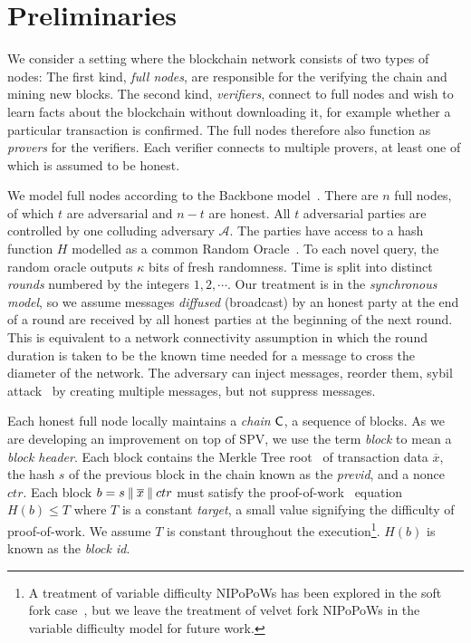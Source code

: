 \section{Preliminaries}\label{sec:preliminaries}

We consider a setting where the blockchain network consists of two
types of nodes: The first kind, \emph{full nodes}, are responsible for the
verifying the chain and mining new blocks. The
second kind, \emph{verifiers}, connect to full nodes and wish to learn facts
about the blockchain without downloading it, for example whether a particular
transaction is confirmed. The full nodes therefore also function as
\emph{provers} for the verifiers. Each verifier connects to multiple provers, at
least one of which is assumed to be honest.

We model full nodes according to the Backbone model~\cite{backbone}. There are
$n$ full nodes, of which $t$ are adversarial and $n - t$ are honest. All $t$
adversarial parties are controlled by one colluding adversary $\mathcal{A}$. The
parties have access to a hash function $H$ modelled as a common Random
Oracle~\cite{ro}. To each novel query, the random oracle outputs $\kappa$ bits
of fresh randomness. Time is split into distinct \emph{rounds} numbered by the
integers $1, 2, \cdots$. Our treatment is in the \emph{synchronous model}, so we
assume messages \emph{diffused} (broadcast) by an honest party at the end of a
round are received by all honest parties at the beginning of the next round.
This is equivalent to a network connectivity assumption in which the round
duration is taken to be the known time needed for a message to cross the
diameter of the network. The adversary can inject messages, reorder them, sybil
attack~\cite{sybil} by creating multiple messages, but not suppress messages.

Each honest full node locally maintains a \emph{chain} $\mathsf{C}$, a sequence of
blocks. As we are developing an improvement on top of SPV, we
use the term \emph{block} to mean a
\emph{block header}. Each block contains the Merkle Tree root~\cite{merkle} of
transaction data
$\overline{x}$, the hash $s$ of the previous block in the chain
known as the \emph{previd}, and a nonce $ctr$. Each block $b = s \mathbin{\|}
\overline{x} \mathbin{\|} ctr$ must satisfy the proof-of-work~\cite{pow} equation $H(b) \leq T$
where $T$ is a constant \emph{target}, a small value signifying the difficulty
of proof-of-work. We assume $T$ is constant throughout the execution\footnote{A
treatment of variable difficulty NIPoPoWs has been explored in the soft fork
case~\cite{dionyziz}, but we leave the treatment of velvet fork NIPoPoWs in the
variable difficulty model for future work.}. $H(b)$ is
known as the \emph{block id}.

